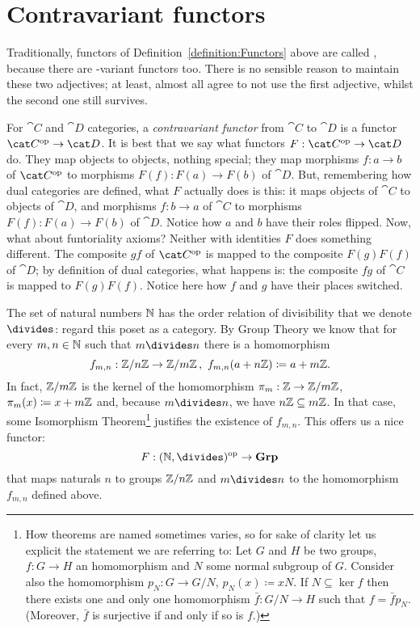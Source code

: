 
\section{Contravariant functors}

Traditionally, functors of Definition~\ref{definition:Functors} above are called , because there are -variant functors too. There is no sensible reason to maintain these two adjectives; at least, almost all agree to not use the first adjective, whilst the second one still survives.

For \(\cat C\) and \(\cat D\) categories, a {\em contravariant functor} from \(\cat C\) to \(\cat D\) is a functor \(\op{\cat C} \to \cat D\). It is best that we say what functors \(F : \op{\cat C} \to \cat D\) do. They map objects to objects, nothing special; they map morphisms \(f : a \to b\) of \(\op{\cat C}\) to morphisms \(F(f) : F(a) \to F(b)\) of \(\cat D\). But, remembering how dual categories are defined, what \(F\) actually does is this: it maps objects of \(\cat C\) to objects of \(\cat D\), and morphisms \(f : b \to a\) of \(\cat C\) to morphisms \(F(f) : F(a) \to F(b)\) of \(\cat D\). Notice how \(a\) and \(b\) have their roles flipped. Now, what about funtoriality axioms? Neither with identities \(F\) does something different. The composite \(gf\) of \(\op{\cat C}\) is mapped to the composite \(F(g)F(f)\) of \(\cat D\); by definition of dual categories, what happens is: the composite \(fg\) of \(\cat C\) is mapped to \(F(g)F(f)\). Notice here how \(f\) and \(g\) have their places switched.

\begin{example}
The set of natural numbers \(\mathbb N\) has the order relation of divisibility that we denote \(\divides\): regard this poset as a category. By Group Theory we know that for every \(m, n \in \mathbb N\) such that \(m \divides n\) there is a homomorphism
\[f_{m, n} : \mathbb Z/n\mathbb Z \to \mathbb Z/m\mathbb Z\,,\ f_{m, n}(a +n\mathbb Z) \coloneq a + m\mathbb Z .\]
In fact, \(\mathbb Z/m\mathbb Z\) is the kernel of the homomorphism \(\pi_m : \mathbb Z \to \mathbb Z/m\mathbb Z\), \(\pi_m(x) \coloneq x + m\mathbb Z\) and, because \(m \divides n\), we have \(n\mathbb Z \subseteq m\mathbb Z\). In that case, some Isomorphism Theorem\footnote{How theorems are named sometimes varies, so for sake of clarity let us explicit the statement we are referring to: Let \(G\) and \(H\) be two groups, \(f : G \to H\) an homomorphism and \(N\) some normal subgroup of \(G\). Consider also the homomorphism \(p_N : G \to G/N\), \(p_N(x) \coloneq xN\). If \(N \subseteq \ker f\) then there exists one and only one homomorphism \(\bar f : G/N \to H\) such that
\(f = \bar f p_N\).
(Moreover, \(\bar f\) is surjective if and only if so is \(f\).)} justifies the existence of \(f_{m, n}\).
This offers us a nice functor:
\[F : \op{(\nats, \divides)} \to \Grp\]
that maps naturals \(n\) to groups \(\mathbb Z/n\mathbb Z\) and \(m \divides n\) to the homomorphism \(f_{m,n}\) defined above.
\end{example}
